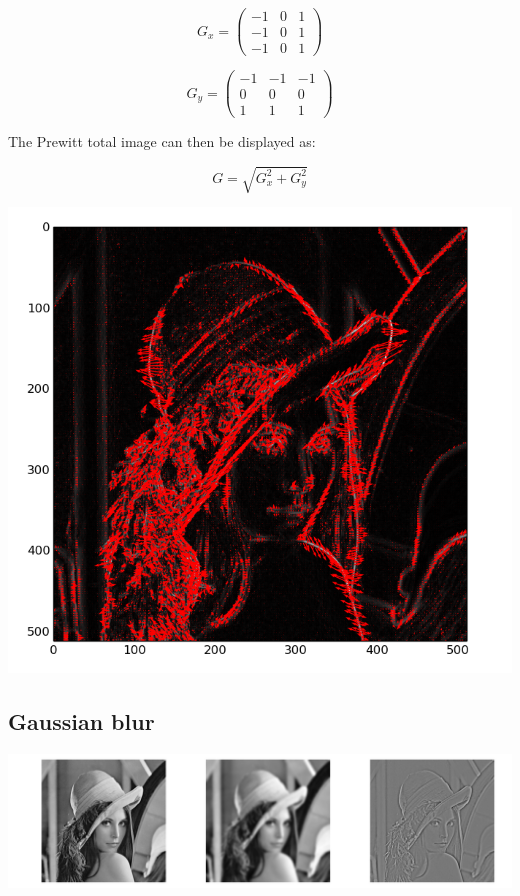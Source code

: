 \documentclass[a4paper,12px]{article}
\begin{document}
$$ G_x = \left(\begin{array}{ccc} -1 & 0 & 1 \\ -1 & 0 & 1 \\ -1 & 0 & 1
\end{array}\right)$$

$$ G_y = \left(\begin{array}{ccc} -1 & -1 & -1 \\ 0 & 0 & 0 \\ 1 & 1 & 1
\end{array}\right)$$

The Prewitt total image can then be displayed as:

$$ G = \sqrt{G_x^2 + G_y^2} $$

\begin{center}
    \includegraphics[width=\textwidth]{gradient}
\end{center}

\subsection{Gaussian blur}



\begin{center}
    \includegraphics[width=\textwidth]{gauss}
\end{center}
\end{document}
